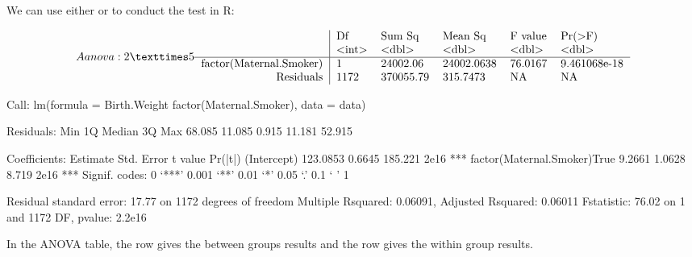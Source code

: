 \documentclass[letterpaper,10pt,english]{jupyterBook}
\begin{document}
\sphinxAtStartPar
We can use either  or  to conduct the test in R:

\begin{sphinxVerbatim}[commandchars=\\\{\}]
 
\end{sphinxVerbatim}
\begin{equation*}
\begin{split}A anova: 2 × 5
\begin{tabular}{r|lllll}
  & Df & Sum Sq & Mean Sq & F value & Pr(>F)\\
  & <int> & <dbl> & <dbl> & <dbl> & <dbl>\\
\hline
	factor(Maternal.Smoker) &    1 &  24002.06 & 24002.0638 & 76.0167 & 9.461068e-18\\
	Residuals & 1172 & 370055.79 &   315.7473 &      NA &           NA\\
\end{tabular}\end{split}
\end{equation*}
\begin{sphinxVerbatim}[commandchars=\\\{\}]
Call:
lm(formula = Birth.Weight \PYGZti{} factor(Maternal.Smoker), data = data)

Residuals:
    Min      1Q  Median      3Q     Max 
\PYGZhy{}68.085 \PYGZhy{}11.085   0.915  11.181  52.915 

Coefficients:
                            Estimate Std. Error t value Pr(\PYGZgt{}|t|)    
(Intercept)                 123.0853     0.6645 185.221   \PYGZlt{}2e\PYGZhy{}16 ***
factor(Maternal.Smoker)True  \PYGZhy{}9.2661     1.0628  \PYGZhy{}8.719   \PYGZlt{}2e\PYGZhy{}16 ***
\PYGZhy{}\PYGZhy{}\PYGZhy{}
Signif. codes:  0 ‘***’ 0.001 ‘**’ 0.01 ‘*’ 0.05 ‘.’ 0.1 ‘ ’ 1

Residual standard error: 17.77 on 1172 degrees of freedom
Multiple R\PYGZhy{}squared:  0.06091,	Adjusted R\PYGZhy{}squared:  0.06011 
F\PYGZhy{}statistic: 76.02 on 1 and 1172 DF,  p\PYGZhy{}value: \PYGZlt{} 2.2e\PYGZhy{}16
\end{sphinxVerbatim}

\sphinxAtStartPar
In the ANOVA table, the  row gives the between groups results and the  row gives the within group results.
\end{document}
